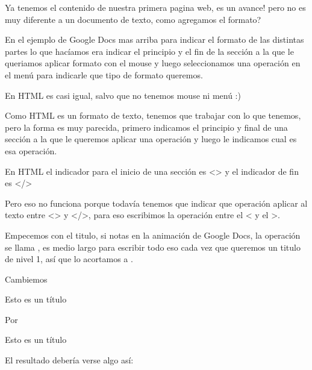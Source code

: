 \documentclass[letterpaper,10pt,spanish]{sphinxmanual}
\begin{document}
Ya tenemos el contenido de nuestra primera pagina web, es un avance! pero no
es muy diferente a un documento de texto, como agregamos el formato?

En el ejemplo de Google Docs mas arriba para indicar el formato de las
distintas partes lo que hacíamos era indicar el principio y el fin de la
sección a la que le queriamos aplicar formato con el mouse y luego
seleccionamos una operación en el menú para indicarle que tipo de formato
queremos.

En HTML es casi igual, salvo que no tenemos mouse ni menú :)

Como HTML es un formato de texto, tenemos que trabajar con lo que tenemos,
pero la forma es muy parecida, primero indicamos el principio y final de una
sección a la que le queremos aplicar una operación y luego le indicamos cual es
esa operación.

En HTML el indicador para el inicio de una sección es \textless{}\textgreater{} y el indicador de fin es \textless{}/\textgreater{}

Pero eso no funciona porque todavía tenemos que indicar que operación aplicar al texto entre \textless{}\textgreater{} y \textless{}/\textgreater{}, para eso escribimos la operación entre el \textless{} y el \textgreater{}.

Empecemos con el titulo, si notas en la animación de Google Docs, la operación se llama , es medio largo para escribir todo eso cada vez que queremos un titulo de nivel 1, así que lo acortamos a .

Cambiemos

%
\begin{sphinxVerbatim}[commandchars=\\\{\}]
Esto es un título
\end{sphinxVerbatim}

Por

%
\begin{sphinxVerbatim}[commandchars=\\\{\}]
Esto es un título
\end{sphinxVerbatim}

El resultado debería verse algo así:

\begin{figure}[htbp]
\centering

\noindent{}
\end{figure}
\end{document}

